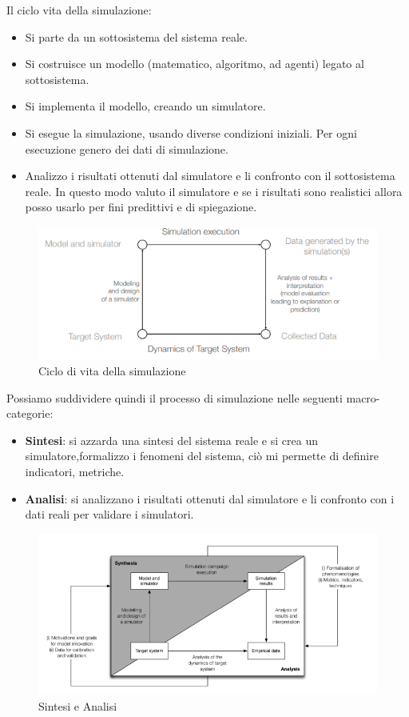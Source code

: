Il ciclo vita della simulazione:
\begin{itemize}
    \item Si parte da un sottosistema del sistema reale.
    \item Si costruisce un modello (matematico, algoritmo, ad agenti) legato al
          sottosistema.
    \item Si implementa il modello, creando un simulatore.
    \item Si esegue la simulazione, usando diverse condizioni iniziali. Per ogni
          esecuzione genero dei dati di simulazione.
    \item Analizzo i risultati ottenuti dal simulatore e li confronto con il
          sottosistema reale. In questo modo valuto il simulatore e se i risultati
          sono realistici allora posso usarlo per fini predittivi e di spiegazione.
\end{itemize}
\begin{figure}
    \centering
    \includegraphics[scale=0.5]{./img/sim/ciclobase.png}
    \caption{Ciclo di vita della simulazione}
    \label{fig:ciclo_simulazione}
\end{figure}

Possiamo suddividere quindi il processo di simulazione nelle seguenti macro-categorie:
\begin{itemize}
    \item \textbf{Sintesi}: si azzarda una sintesi del sistema reale e si crea
          un simulatore,formalizzo i fenomeni del sistema, ciò mi permette di
          definire indicatori, metriche.
    \item \textbf{Analisi}: si analizzano i risultati ottenuti dal simulatore e
          li confronto con i dati reali per validare i simulatori.
\end{itemize}
\begin{figure}
    \centering
    \includegraphics[scale=0.5]{./img/sim/lifecycle.png}
    \caption{Sintesi e Analisi}
    \label{fig:sintesi_analisi}
\end{figure}

